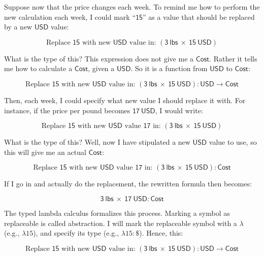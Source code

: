 \documentclass{article}
\newcommand\term{\mathsf}
\def\abstrBinder/{\lambda}
\begin{document}
Suppose now that the price changes each week. To remind me how to perform the new calculation each week, I could mark ``$\term{15}$'' as a value that should be replaced by a new $\term{USD}$ value:

\begin{equation*}
  \text{Replace $\term{15}$ with new $\term{USD}$ value in: } \term{(3~lbs~\times~15~USD)}
\end{equation*}

What is the type of this? This expression does not give me a $\term{Cost}$. Rather it tells me how to calculate a $\term{Cost}$, given a $\term{USD}$. So it is a function from $\term{USD}$ to $\term{Cost}$:

\begin{equation*}
  \text{Replace $\term{15}$ with new $\term{USD}$ value in: } \term{(3~lbs~\times~15~USD):USD \rightarrow Cost}
\end{equation*}

Then, each week, I could specify what new value I should replace it with. For instance, if the price per pound becomes $\term{17~USD}$, I would write:

\begin{equation*}
  \text{Replace $\term{15}$ with new $\term{USD}$ value $\term{17}$ in: } \term{(3~lbs~\times~15~USD)}
\end{equation*}

What is the type of this? Well, now I have stipulated a new $\term{USD}$ value to use, so this will give me an actual $\term{Cost}$:

\begin{equation*}
  \text{Replace $\term{15}$ with new $\term{USD}$ value $\term{17}$ in: } \term{(3~lbs~\times~15~USD):Cost}
\end{equation*}

If I go in and actually do the replacement, the rewritten formula then becomes:

\begin{equation*}
  \term{3~lbs~\times~17~USD:Cost}
\end{equation*}

The typed lambda calculus formalizes this process. Marking a symbol as replaceable is called abstraction. I will mark the replaceable symbol with a $\abstrBinder/$ (e.g., $\abstrBinder/ 15$), and specify its type (e.g., $\abstrBinder/ 15 : \$$). Hence, this:

\begin{equation*}
  \text{Replace $\term{15}$ with new $\term{USD}$ value in: } \term{(3~lbs~\times~15~USD):USD \rightarrow Cost}
\end{equation*}
\end{document}
